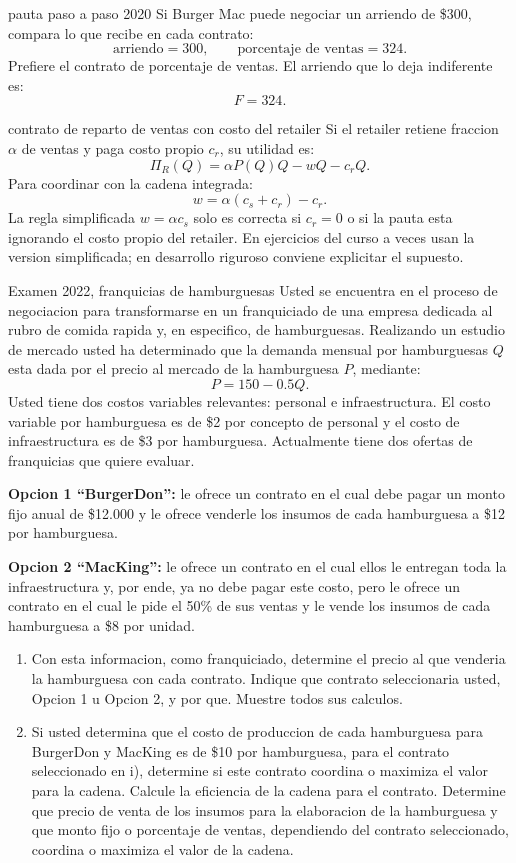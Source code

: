 \begin{pautacompleta}{pauta paso a paso 2020}
Si Burger Mac puede negociar un arriendo de \$300, compara lo que recibe en cada contrato:
\[
  \text{arriendo}=300,
  \qquad
  \text{porcentaje de ventas}=324.
\]
Prefiere el contrato de porcentaje de ventas. El arriendo que lo deja indiferente es:
\[
  F=324.
\]
\end{pautacompleta}

\begin{alerta}{contrato de reparto de ventas con costo del retailer}
Si el retailer retiene fraccion $\alpha$ de ventas y paga costo propio $c_r$, su utilidad es:
\[
  \Pi_R(Q)=\alpha P(Q)Q-wQ-c_rQ.
\]
Para coordinar con la cadena integrada:
\[
  w=\alpha(c_s+c_r)-c_r.
\]
La regla simplificada $w=\alpha c_s$ solo es correcta si $c_r=0$ o si la pauta esta ignorando el costo propio del retailer. En ejercicios del curso a veces usan la version simplificada; en desarrollo riguroso conviene explicitar el supuesto.
\end{alerta}

\begin{enunciado}{Examen 2022, franquicias de hamburguesas}
Usted se encuentra en el proceso de negociacion para transformarse en un franquiciado de una empresa dedicada al rubro de comida rapida y, en especifico, de hamburguesas. Realizando un estudio de mercado usted ha determinado que la demanda mensual por hamburguesas $Q$ esta dada por el precio al mercado de la hamburguesa $P$, mediante:
\[
  P=150-0.5Q.
\]
Usted tiene dos costos variables relevantes: personal e infraestructura. El costo variable por hamburguesa es de \$2 por concepto de personal y el costo de infraestructura es de \$3 por hamburguesa. Actualmente tiene dos ofertas de franquicias que quiere evaluar.

\textbf{Opcion 1 ``BurgerDon'':} le ofrece un contrato en el cual debe pagar un monto fijo anual de \$12.000 y le ofrece venderle los insumos de cada hamburguesa a \$12 por hamburguesa.

\textbf{Opcion 2 ``MacKing'':} le ofrece un contrato en el cual ellos le entregan toda la infraestructura y, por ende, ya no debe pagar este costo, pero le ofrece un contrato en el cual le pide el 50\% de sus ventas y le vende los insumos de cada hamburguesa a \$8 por unidad.

\begin{enumerate}[label=\roman*.]
  \item Con esta informacion, como franquiciado, determine el precio al que venderia la hamburguesa con cada contrato. Indique que contrato seleccionaria usted, Opcion 1 u Opcion 2, y por que. Muestre todos sus calculos.
  \item Si usted determina que el costo de produccion de cada hamburguesa para BurgerDon y MacKing es de \$10 por hamburguesa, para el contrato seleccionado en i), determine si este contrato coordina o maximiza el valor para la cadena. Calcule la eficiencia de la cadena para el contrato. Determine que precio de venta de los insumos para la elaboracion de la hamburguesa y que monto fijo o porcentaje de ventas, dependiendo del contrato seleccionado, coordina o maximiza el valor de la cadena.
\end{enumerate}
\end{enunciado}

